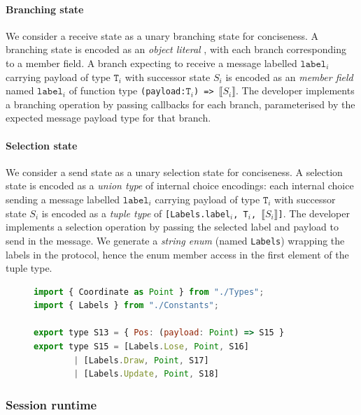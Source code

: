 \documentclass[submission,copyright,creativecommons]{eptcs}
\begin{document}
\paragraph{Branching state} We consider a receive state as a unary branching state for conciseness. A branching state is encoded as an \textit{object literal} \cite{TypeScriptSpec}, with each branch corresponding to a member field. A branch expecting to receive a message labelled $\texttt{label}_i$ carrying payload of type $\texttt{T}_i$ with successor state $S_i$ is encoded as an \textit{member field} named $\texttt{label}_i$ of function type \texttt{(payload:$\texttt{T}_i$) => $\llbracket S_i \rrbracket$}. The developer implements a branching operation by passing callbacks for each branch, parameterised by the expected message payload type for that branch.

\paragraph{Selection state} We consider a send state as a unary selection state for conciseness. A selection state is encoded as a \textit{union type} \cite{TypeScriptSpec} of internal choice encodings: each internal choice sending a message labelled $\texttt{label}_i$ carrying payload of type $\texttt{T}_i$ with successor state $S_i$ is encoded as a \textit{tuple type} of \texttt{[Labels.label$_i$, T$_i$, $\llbracket S_i \rrbracket$]}. The developer implements a selection operation by passing the selected label and payload to send in the message. We generate a \textit{string enum} (named \texttt{Labels}) wrapping the labels in the protocol, hence the enum member access in the first element of the tuple type.

\begin{figure}[!h]
\begin{lstlisting}[language=JavaScript]
import { Coordinate as Point } from "./Types";
import { Labels } from "./Constants";

export type S13 = { Pos: (payload: Point) => S15 }
export type S15 = [Labels.Lose, Point, S16]
		| [Labels.Draw, Point, S17]
		| [Labels.Update, Point, S18]
\end{lstlisting}  
\label{lst:svr}
\end{figure}

\subsubsection{Session runtime}
\label{section:serversessionapi}
\end{document}
